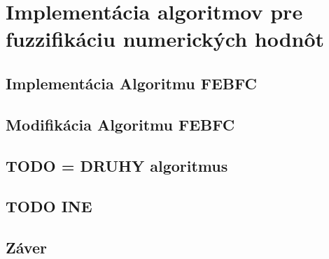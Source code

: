 \chapter{Implementácia algoritmov pre fuzzifikáciu numerických hodnôt} 

\section{Implementácia Algoritmu FEBFC}

\section{Modifikácia Algoritmu FEBFC}

\section{TODO = DRUHY algoritmus}

\section{TODO INE }

\section{Záver}